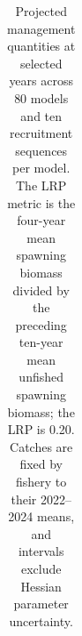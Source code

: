 \documentclass[
  english,
  a4paper,
  a4paper,
  11pt]{SCreport}
\providecommand{\DIFaddbegin}{} %
\providecommand{\DIFdelbegin}{} %
\providecommand{\DIFdelend}{} %
\newcommand{\DIFscaledelfig}{0.5}
\newlength{\DIFdelgraphicswidth} %
\newlength{\DIFdelgraphicsheight} %
\newcommand{\DIFaddincludegraphics}[2][]{{\color{blue}\fbox{\DIFOincludegraphics[#1]{#2}}}} %
\newcommand{\DIFdelincludegraphics}[2][]{%
\sbox{\DIFdelgraphicsbox}{\DIFOincludegraphics[#1]{#2}}%
\settoboxwidth{\DIFdelgraphicswidth}{\DIFdelgraphicsbox} %
\settoboxtotalheight{\DIFdelgraphicsheight}{\DIFdelgraphicsbox} %
\scalebox{\DIFscaledelfig}{%
\parbox[b]{\DIFdelgraphicswidth}{\usebox{\DIFdelgraphicsbox}\\[-\baselineskip] \rule{\DIFdelgraphicswidth}{0em}}\llap{\resizebox{\DIFdelgraphicswidth}{\DIFdelgraphicsheight}{%
\setlength{\unitlength}{\DIFdelgraphicswidth}%
\begin{picture}(1,1)%
\thicklines\linethickness{2pt} %
{\color[rgb]{1,0,0}\put(0,0){\framebox(1,1){}}}%
{\color[rgb]{1,0,0}\put(0,0){\line( 1,1){1}}}%
{\color[rgb]{1,0,0}\put(0,1){\line(1,-1){1}}}%
\end{picture}%
}\hspace*{3pt}}} %
} %
\DeclareRobustCommand{\DIFaddbegin}{\DIFOaddbegin \let\includegraphics\DIFaddincludegraphics} %
\DeclareRobustCommand{\DIFdelbegin}{\DIFOdelbegin \let\includegraphics\DIFdelincludegraphics} %
\DeclareRobustCommand{\DIFdelend}{\DIFOaddend \let\includegraphics\DIFOincludegraphics} %
\begin{document}
\begin{landscape}
\begingroup
\small
\setlength{\tabcolsep}{3pt}
\renewcommand{\arraystretch}{1.12}

\DIFdelbegin %
\DIFdelend \DIFaddbegin \begin{longtable}{@{}rrrrr>{\raggedleft\arraybackslash}p{0.22\linewidth}rrr@{}}

\caption{\label{tbl-stock-projections}Projected management quantities at selected years across 80 models and ten recruitment sequences per model. The LRP metric is the four-year mean spawning biomass divided by the preceding ten-year mean unfished spawning biomass; the LRP is 0.20. Catches are fixed by fishery to their 2022--2024 means, and intervals exclude Hessian parameter uncertainty.}


\end{longtable}
\end{landscape}
\end{document}

